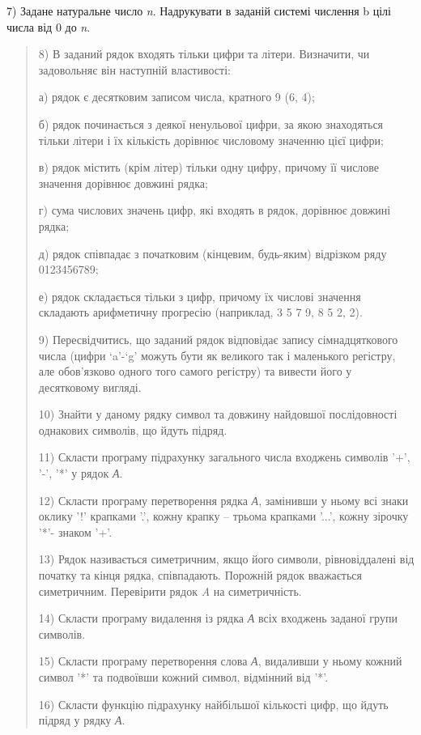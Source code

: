 \documentclass[]{article}
\begin{document}
7) Задане натуральне число \emph{n}. Надрукувати в заданій системі
числення b цілі числа від 0 до \emph{n}.

\begin{quote}
8) В заданий рядок входять тільки цифри та літери. Визначити, чи
задовольняє він наступній властивості:

а) рядок є десятковим записом числа, кратного 9 (6, 4);

б) рядок починається з деякої ненульової цифри, за якою знаходяться
тільки літери і їх кількість дорівнює числовому значенню цієї цифри;

в) рядок містить (крім літер) тільки одну цифру, причому її числове
значення дорівнює довжині рядка;

г) сума числових значень цифр, які входять в рядок, дорівнює довжині
рядка;

д) рядок співпадає з початковим (кінцевим, будь-яким) відрізком ряду
0123456789;

е) рядок складається тільки з цифр, причому їх числові значення
складають арифметичну прогресію (наприклад, 3 5 7 9, 8 5 2, 2).

9) Пересвідчитись, що заданий рядок відповідає запису сімнадцяткового
числа (цифри `a'-`g' можуть бути як великого так і маленького регістру,
але обов'язково одного того самого регістру) та вивести його у
десятковому вигляді.

10) Знайти у даному рядку символ та довжину найдовшої послідовності
однакових символів, що йдуть підряд.

11) Скласти програму підрахунку загального числа входжень символів '+',
'-', '*' у рядок \emph{А}.

12) Скласти програму перетворення рядка \emph{А}, замінивши у ньому всі
знаки оклику '!' крапками '.', кожну крапку -- трьома крапками '...',
кожну зірочку '*'- знаком '+'.

13) Рядок називається симетричним, якщо його символи, рівновіддалені від
початку та кінця рядка, співпадають. Порожній рядок вважається
симетричним. Перевірити рядок \emph{A} на симетричність.

14) Скласти програму видалення із рядка \emph{А} всіх входжень заданої
групи символів.

15) Скласти програму перетворення слова \emph{А}, видаливши у ньому
кожний символ '*' та подвоївши кожний символ, відмінний від '*'.

16) Скласти функцію підрахунку найбільшої кількості цифр, що йдуть
підряд у рядку \emph{А}.


\end{quote}
\end{document}
